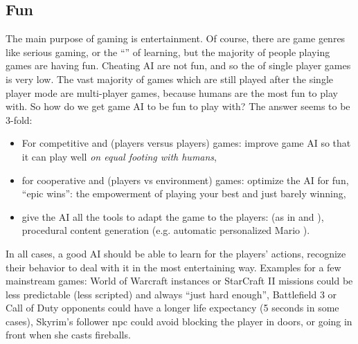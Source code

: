 \subsection{Fun}
The main purpose of gaming is entertainment. Of course, there are game genres like serious gaming, or the ``'' of learning, but the majority of people playing games are having fun. Cheating AI are not fun, and so the  of single player games is very low. The vast majority of games which are still played after the single player mode are multi-player games, because humans are the most fun to play with. So how do we get game AI to be fun to play with? The answer seems to be 3-fold:
\begin{itemize}
\item For competitive and 
(players versus players) games: improve game AI so that it can play well \textit{on equal footing with humans},
\item for cooperative and 
(players vs environment) games: optimize the AI for fun, ``epic wins'': the empowerment of playing your best and just barely winning,
\item give the AI all the tools to adapt the game to the players:  (as in  and ), procedural content generation (e.g. automatic personalized Mario \citep{Shaker10AIIDE}).
\end{itemize}
In all cases, a good AI should be able to learn for the players' actions, recognize their behavior to deal with it in the most entertaining way. Examples for a few mainstream games: World of Warcraft instances or StarCraft II missions could be less predictable (less scripted) and always ``just hard enough'', Battlefield 3 or Call of Duty opponents could have a longer life expectancy (5 seconds in some cases), Skyrim's follower \gls{npc} could avoid blocking the player in doors, or going in front when she casts fireballs.

